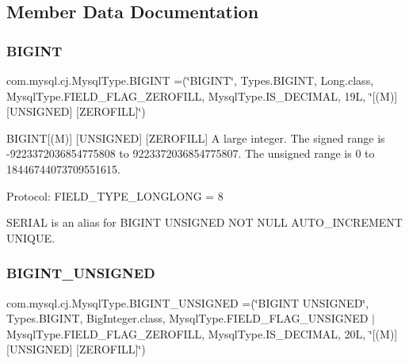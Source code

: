 \subsection{Member Data Documentation}
\mbox{\label{enumcom_1_1mysql_1_1cj_1_1_mysql_type_a5e0b78b90c1ad86e03b108c01d729118}} 
\subsubsection{\texorpdfstring{B\+I\+G\+I\+NT}{BIGINT}}
{\footnotesize\ttfamily com.\+mysql.\+cj.\+Mysql\+Type.\+B\+I\+G\+I\+NT =(\char`\"{}B\+I\+G\+I\+NT\char`\"{}, Types.\+B\+I\+G\+I\+NT, Long.\+class, Mysql\+Type.\+F\+I\+E\+L\+D\+\_\+\+F\+L\+A\+G\+\_\+\+Z\+E\+R\+O\+F\+I\+LL, Mysql\+Type.\+I\+S\+\_\+\+D\+E\+C\+I\+M\+AL, 19\+L, \char`\"{}\mbox{[}(\+M)\mbox{]} \mbox{[}\+U\+N\+S\+I\+G\+N\+E\+D\mbox{]} \mbox{[}\+Z\+E\+R\+O\+F\+I\+L\+L\mbox{]}\char`\"{})}

B\+I\+G\+I\+NT\mbox{[}(M)\mbox{]} \mbox{[}U\+N\+S\+I\+G\+N\+ED\mbox{]} \mbox{[}Z\+E\+R\+O\+F\+I\+LL\mbox{]} A large integer. The signed range is -\/9223372036854775808 to 9223372036854775807. The unsigned range is 0 to 18446744073709551615.

Protocol\+: F\+I\+E\+L\+D\+\_\+\+T\+Y\+P\+E\+\_\+\+L\+O\+N\+G\+L\+O\+NG = 8

S\+E\+R\+I\+AL is an alias for B\+I\+G\+I\+NT U\+N\+S\+I\+G\+N\+ED N\+OT N\+U\+LL A\+U\+T\+O\+\_\+\+I\+N\+C\+R\+E\+M\+E\+NT U\+N\+I\+Q\+UE. \mbox{\label{enumcom_1_1mysql_1_1cj_1_1_mysql_type_a4cb24739cd3da8ce7e10b6cdb0e13765}} 
\subsubsection{\texorpdfstring{B\+I\+G\+I\+N\+T\+\_\+\+U\+N\+S\+I\+G\+N\+ED}{BIGINT\_UNSIGNED}}
{\footnotesize\ttfamily com.\+mysql.\+cj.\+Mysql\+Type.\+B\+I\+G\+I\+N\+T\+\_\+\+U\+N\+S\+I\+G\+N\+ED =(\char`\"{}B\+I\+G\+I\+NT U\+N\+S\+I\+G\+N\+ED\char`\"{}, Types.\+B\+I\+G\+I\+NT, Big\+Integer.\+class, Mysql\+Type.\+F\+I\+E\+L\+D\+\_\+\+F\+L\+A\+G\+\_\+\+U\+N\+S\+I\+G\+N\+ED $\vert$ Mysql\+Type.\+F\+I\+E\+L\+D\+\_\+\+F\+L\+A\+G\+\_\+\+Z\+E\+R\+O\+F\+I\+LL, Mysql\+Type.\+I\+S\+\_\+\+D\+E\+C\+I\+M\+AL, 20\+L, \char`\"{}\mbox{[}(\+M)\mbox{]} \mbox{[}\+U\+N\+S\+I\+G\+N\+E\+D\mbox{]} \mbox{[}\+Z\+E\+R\+O\+F\+I\+L\+L\mbox{]}\char`\"{})}


